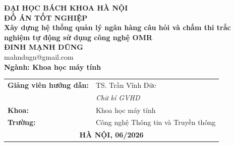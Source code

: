 ﻿\documentclass[DoAn.tex]{subfiles}
\begin{document}
\begin{titlepage}
\thispagestyle{empty}
\begin{center}

{\Large\bfseries ĐẠI HỌC BÁCH KHOA HÀ NỘI}\\[4cm]

{\Huge\bfseries ĐỒ ÁN TỐT NGHIỆP}\\[1cm]
{\Large\bfseries Xây dựng hệ thống quản lý ngân hàng câu hỏi và chấm thi trắc nghiệm tự động sử dụng công nghệ OMR}\\[1cm]

{\large\bfseries ĐINH MẠNH DŨNG}\\
{\large mahndugn@gmail.com}\\[0.5cm]

{\large\bfseries Ngành: Khoa học máy tính}\\

\vspace{4cm}
\begin{tabular}{ll}
\textbf{Giảng viên hướng dẫn:} & TS. Trần Vĩnh Đức\hfill\underline{\hspace{4cm}} \\[0.3cm]
 & \hfill\textit{Chữ kí GVHD}\hfill \\[0.5cm]
\textbf{Khoa:} & Khoa học máy tính \\[0.3cm]
\textbf{Trường:} & Công nghệ Thông tin và Truyền thông \\[3cm]
\multicolumn{2}{c}{\textbf{HÀ NỘI, 06/2026}}
\end{tabular}
\end{center}

\end{titlepage}
\end{document}
